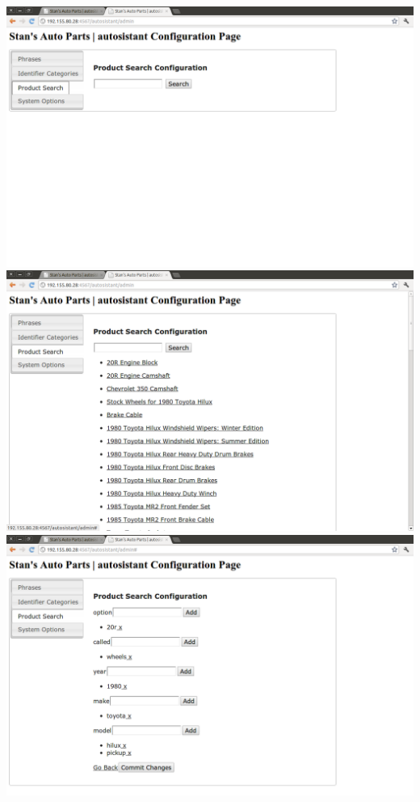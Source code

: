 \documentclass[11pt, titlepage]{article}
\begin{document}
\includegraphics[scale=0.35]{autosistantgui02.png}
\includegraphics[scale=0.35]{autosistantgui03.png}
\includegraphics[scale=0.35]{autosistantgui04.png}
\end{document}
